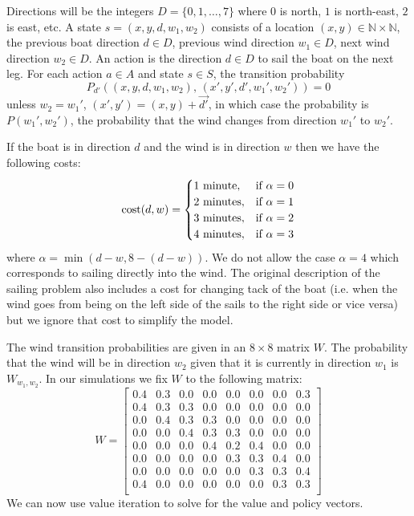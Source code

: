 \documentclass[12pt,amstags,fleqn]{article}
\theoremstyle{plain}
\theoremstyle{definition}
\theoremstyle{definition}
\begin{document}
Directions will be the integers 
$D = \{0, 1, \dots, 7 \}$ where $0$ is north, $1$ is
north-east, $2$ is east, etc. A state $s = (x,y,d,w_1,w_2)$ consists of a location $(x,y) \in
\mathbb{N} \times \mathbb{N}$, the previous boat direction $d \in D$,
previous wind direction $w_1 \in D$, next wind direction $w_2 \in D$.
An action is the direction $d \in D$ to sail the boat on the next leg.
For each action $a \in A$ and state $s \in S$, the transition
probability
\[
P_{d'}((x,y,d,w_1,w_2),\,(x',y',d',w_1',w_2')) = 0
\]
unless $w_2 = w_1'$, $(x',y') = (x,y) + \vec{d'}$, in which case the
probability is $P(w_1', w_2')$, the probability that the wind changes
from direction $w_1'$ to $w_2'$.

If the boat is in direction $d$ and the wind is in direction $w$ then we
have the following costs:
\[
\textnormal{cost}(d,w) =
\begin{cases} 
    1\textnormal{ minute}, &\textnormal{if $\alpha = 0$} \\
    2\textnormal{ minutes}, &\textnormal{if $\alpha = 1$} \\
    3\textnormal{ minutes}, &\textnormal{if $\alpha = 2$} \\
    4\textnormal{ minutes}, &\textnormal{if $\alpha = 3$}
\end{cases}
\]
where $\alpha = \min(d-w, 8-(d-w))$. We do not allow the case
$\alpha = 4$ which corresponds to sailing directly into the wind.
The original description of the sailing problem also includes a cost
for changing tack of the boat (i.e. when the wind goes from being on
the left side of the sails to the right side or vice versa) but we
ignore that cost to simplify the model.

The wind transition probabilities are given in an $8 \times 8$ matrix
$W$. The probability that the wind will be in direction $w_2$ given that it
is currently in direction $w_1$ is $W_{w_1,w_2}$. In our simulations we fix
$W$ to the following matrix: 
\[
W =
\left[ {\begin{array}{cccccccc}
0.4 & 0.3 & 0.0 & 0.0 & 0.0 & 0.0 & 0.0 & 0.3 \\
0.4 & 0.3 & 0.3 & 0.0 & 0.0 & 0.0 & 0.0 & 0.0 \\
0.0 & 0.4 & 0.3 & 0.3 & 0.0 & 0.0 & 0.0 & 0.0 \\
0.0 & 0.0 & 0.4 & 0.3 & 0.3 & 0.0 & 0.0 & 0.0 \\
0.0 & 0.0 & 0.0 & 0.4 & 0.2 & 0.4 & 0.0 & 0.0 \\
0.0 & 0.0 & 0.0 & 0.0 & 0.3 & 0.3 & 0.4 & 0.0 \\
0.0 & 0.0 & 0.0 & 0.0 & 0.0 & 0.3 & 0.3 & 0.4 \\
0.4 & 0.0 & 0.0 & 0.0 & 0.0 & 0.0 & 0.3 & 0.3 \\
 \end{array} } \right]
\]
We can now use value iteration to solve for the value and policy
vectors.
\end{document}

